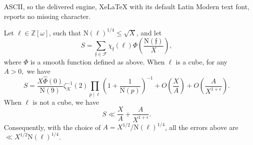 \documentclass[10pt,a4paper]{amsart}
\newcommand{\norm}{\mathrm{N}}
\begin{document}
ASCII, so the delivered engine, XeLaTeX with its default Latin Modern text font, reports no missing character.
\begin{theorem}
\label{theorem S_1}
    Let $\ell\in\mathbb{Z}[\omega]$, such that $\norm(\ell)^{1/4}\le \sqrt{X}$, and let
    $$S=\sum_{\mathfrak{f}\in \mathcal{F}}\chi_{\mathfrak{f}}(\ell)\Phi\left(\frac{\norm(\mathfrak{f})}{X}\right),$$
    where $\Phi$ is a smooth function defined as above.   
    When $\ell$ is a cube, for any $A>0,$ we have
    $$S=\frac{X\widehat{\Phi}(0)}{\norm(9)}  \zeta^{-1}_\mathcal{K}(2)  \prod_{p\mid \ell}\left(1+\frac{1}{\norm(p)}\right)^{-1} +O\left(\frac{X}{A}\right)+O\left(\frac{A}{X^{1+\epsilon}}\right).$$
    When $\ell$ is not a cube, we have
    $$S
    \ll
    \frac{X}{A}+\frac{A}{X^{1+\epsilon}}.
    $$
Consequently, with the choice of $A=X^{1/2}/\norm(\ell)^{1/4}$, all the errors above are
$\ll X^{1/2}\norm(\ell)^{1/4}$.
\end{theorem}
\end{document}
